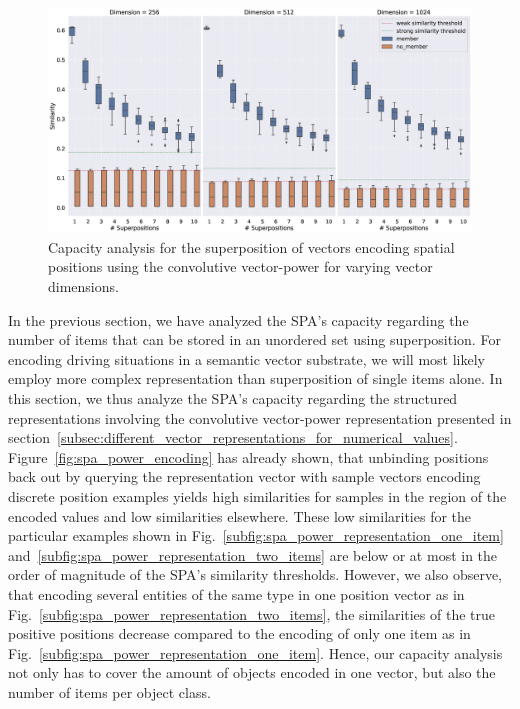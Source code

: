 \begin{figure}[t]
    \centering
    \includegraphics[width=0.95\linewidth]{imgs/spa_power_capacity.eps}
    \caption{Capacity analysis for the superposition of vectors encoding spatial positions using the convolutive vector-power for varying vector dimensions.}
    \label{fig:spa_power_capacity}
\end{figure}

In the previous section, we have analyzed the \ac{SPA}'s capacity regarding the number of items that can be stored in an unordered set using superposition.
For encoding driving situations in a semantic vector substrate, we will most likely employ more complex representation than superposition of single items alone.
In this section, we thus analyze the \ac{SPA}'s capacity regarding the structured representations involving the convolutive vector-power representation presented in section~\ref{subsec:different_vector_representations_for_numerical_values}.
Figure~\ref{fig:spa_power_encoding} has already shown, that unbinding positions back out by querying the representation vector with sample vectors encoding discrete position examples yields high similarities for samples in the region of the encoded values and low similarities elsewhere.
These low similarities for the particular examples shown in Fig.~\ref{subfig:spa_power_representation_one_item} and~\ref{subfig:spa_power_representation_two_items} are below or at most in the order of magnitude of the \ac{SPA}'s similarity thresholds.
However, we also observe, that encoding several entities of the same type in one position vector as in Fig.~\ref{subfig:spa_power_representation_two_items}, the similarities of the true positive positions decrease compared to the encoding of only one item as in Fig.~\ref{subfig:spa_power_representation_one_item}.
Hence, our capacity analysis not only has to cover the amount of objects encoded in one vector, but also the number of items per object class.

